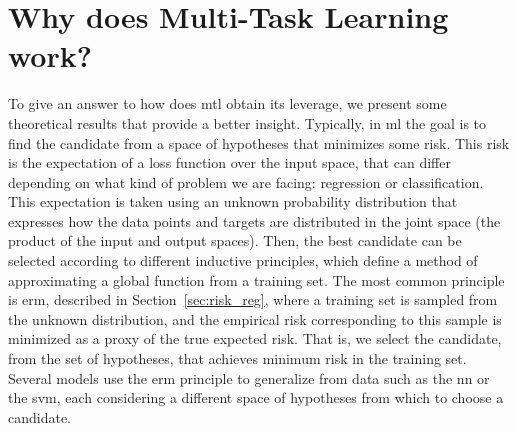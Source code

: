 
\section{Why does Multi-Task Learning work?}\label{sec:ch3_mtl_theory}
To give an answer to how does \acrshort{mtl} obtain its leverage, we present some theoretical results that provide a better insight.
Typically, in \acrshort{ml} the goal is to find the candidate from a space of hypotheses that minimizes some risk. 
This risk is the expectation of a loss function over the input space, that can differ depending on what kind of problem we are facing: regression or classification. This expectation is taken using an unknown probability distribution that expresses how the data points and targets are distributed in the joint space (the product of the input and output spaces). 
Then, the best candidate can be selected according to different inductive principles, which define a method of approximating a global function from a training set.
%
%
The most common principle is \acrfull{erm}, described in Section~\ref{sec:risk_reg}, where a training set is sampled from the unknown distribution, and the empirical risk corresponding to this sample is minimized as a proxy of the true expected risk. That is, we select the candidate, from the set of hypotheses, that achieves minimum risk in the training set. 
%
Several models use the \acrshort{erm} principle to generalize from data such as the \acrshort{nn} or the \acrshort{svm}, each considering a different space of hypotheses from which to choose a candidate. 
